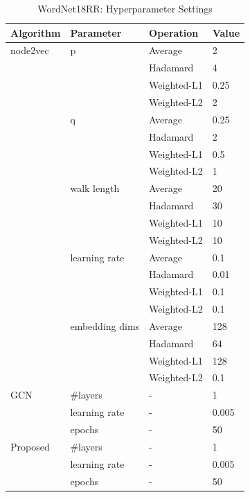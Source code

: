 \documentclass[sigconf]{acmart}
\begin{document}
\begin{table}[!ht]
    \centering
    \caption{WordNet18RR: Hyperparameter Settings}
    \label{tab:lp-hyper-2}
    \begin{tabular}{llll}
        \toprule
        \textbf{Algorithm} & \textbf{Parameter} & \textbf{Operation}& \textbf{Value}\\
        \midrule
        node2vec & p & Average & 2\\
                 & & Hadamard & 4\\
                 & & Weighted-L1 & 0.25\\
                 & & Weighted-L2 & 2\\
                 & q & Average & 0.25\\
                 & & Hadamard & 2\\
                 & & Weighted-L1 & 0.5\\
                 & & Weighted-L2 & 1\\
                 & walk length & Average & 20\\
                 & & Hadamard & 30\\
                 & & Weighted-L1 & 10\\
                 & & Weighted-L2 & 10\\
                 & learning rate & Average & 0.1\\
                 & & Hadamard & 0.01\\
                 & & Weighted-L1 & 0.1\\
                 & & Weighted-L2 & 0.1\\
                 & embedding dims & Average & 128\\
                 & & Hadamard & 64\\
                 & & Weighted-L1 & 128\\
                 & & Weighted-L2 & 0.1\\
        GCN & \#layers & - & 1\\
            & learning rate & - & 0.005\\
            & epochs & - & 50\\
        Proposed & \#layers & - & 1\\
                 & learning rate & - & 0.005\\
                 & epochs & - & 50\\
       \bottomrule
    \end{tabular}
\end{table}
\end{document}
